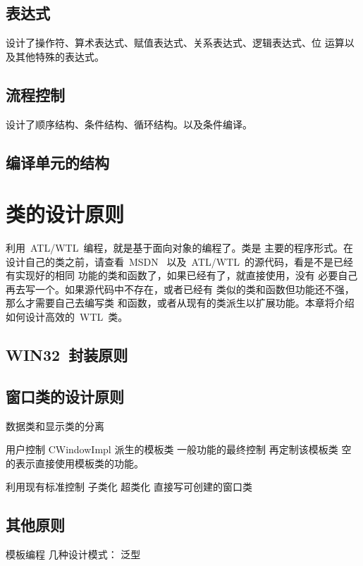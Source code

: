 \section{表达式}

设计了操作符、算术表达式、赋值表达式、关系表达式、逻辑表达式、位
运算以及其他特殊的表达式。

\section{流程控制}

设计了顺序结构、条件结构、循环结构。以及条件编译。

\section{编译单元的结构}


\chapter{类的设计原则}

利用~ATL/WTL~编程，就是基于面向对象的编程了。类是
主要的程序形式。在设计自己的类之前，请查看~MSDN~
以及~ATL/WTL~的源代码，看是不是已经有实现好的相同
功能的类和函数了，如果已经有了，就直接使用，没有
必要自己再去写一个。如果源代码中不存在，或者已经有
类似的类和函数但功能还不强，那么才需要自己去编写类
和函数，或者从现有的类派生以扩展功能。本章将介绍
如何设计高效的~WTL~类。

\section{WIN32~封装原则}



\section{窗口类的设计原则}

数据类和显示类的分离

用户控制
CWindowImpl 派生的模板类
一般功能的最终控制 再定制该模板类
空的表示直接使用模板类的功能。

利用现有标准控制 子类化 超类化
直接写可创建的窗口类

\section{其他原则}

模板编程
几种设计模式：
泛型


